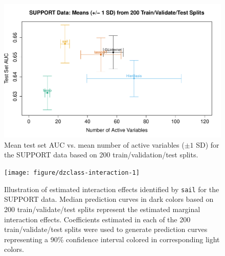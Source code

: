 \documentclass[12pt,letter]{article}\usepackage[]{graphicx}\usepackage[]{color}
\newenvironment{knitrout}{}{} %
\begin{document}
\begin{knitrout}\scriptsize
{}\color{fgcolor}\begin{figure}[H]

{\centering \includegraphics[width=1\linewidth]{figure/support-error-cross-1} 

}

\caption[Mean test set AUC vs]{Mean test set AUC vs. mean number of active variables ($\pm 1$ SD) for the SUPPORT data based on 200 train/validation/test splits.}\label{fig:support-error-cross}
\end{figure}


\end{knitrout}

\begin{knitrout}\scriptsize
{}\color{fgcolor}\begin{figure}[H]

{\centering \texttt{[image: figure/dzclass-interaction-1]} 

}

\caption[Illustration of estimated interaction effects identified by \texttt{sail} for the SUPPORT data]{Illustration of estimated interaction effects identified by \texttt{sail} for the SUPPORT data. Median prediction curves in dark colors based on 200 train/validate/test splits represent the estimated marginal interaction effects. Coefficients estimated in each of the 200 train/validate/test splits were used to generate prediction curves representing a 90\% confidence interval colored in corresponding light colors.}\label{fig:dzclass-interaction}
\end{figure}


\end{knitrout}
\end{document}
